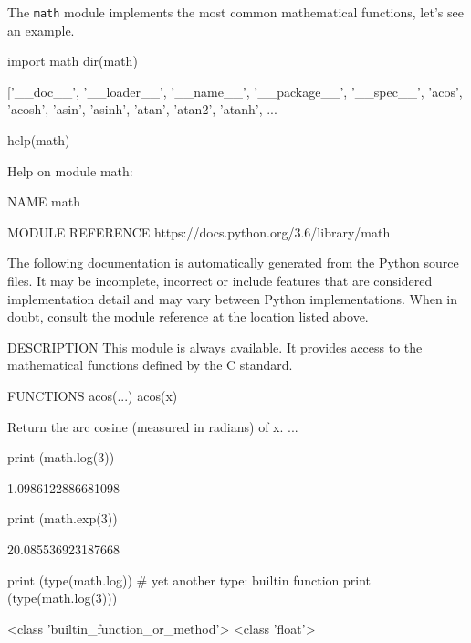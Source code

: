 The \texttt{math} module implements the most common mathematical functions, let's see an example. 

\begin{ipythonnon}
import math
dir(math)
\end{ipythonnon}
\begin{ioutput}
['\_\_doc\_\_',
 '\_\_loader\_\_',
 '\_\_name\_\_',
 '\_\_package\_\_',
 '\_\_spec\_\_',
 'acos',
 'acosh',
 'asin',
 'asinh',
 'atan',
 'atan2',
 'atanh',
 ...
\end{ioutput}

\begin{ipythonnon}
help(math)
\end{ipythonnon}
\begin{ioutput}
Help on module math:

NAME
math

MODULE REFERENCE
https://docs.python.org/3.6/library/math

The following documentation is automatically generated from the Python
source files.  It may be incomplete, incorrect or include features that
are considered implementation detail and may vary between Python
implementations.  When in doubt, consult the module reference at the
location listed above.

DESCRIPTION
This module is always available.  It provides access to the
mathematical functions defined by the C standard.

FUNCTIONS
acos(...)
acos(x)

Return the arc cosine (measured in radians) of x.
...
\end{ioutput}

\begin{ipythonnon}
print (math.log(3))
\end{ipythonnon}
\begin{ioutput}
1.0986122886681098	
\end{ioutput}

\begin{ipythonnon}
print (math.exp(3))
\end{ipythonnon}
\begin{ioutput}
20.085536923187668	
\end{ioutput}

\begin{ipythonnon}
print (type(math.log)) # yet another type: builtin function
print (type(math.log(3)))
\end{ipythonnon}
\begin{ioutput}
<class 'builtin\_function\_or\_method'>
<class 'float'>	
\end{ioutput}

